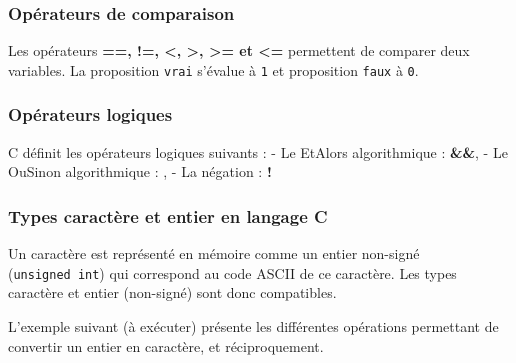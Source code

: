 \documentclass[11pt]{article}
\begin{document}
    \hypertarget{opuxe9rateurs-de-comparaison}{%
\subsubsection{Opérateurs de
comparaison}\label{opuxe9rateurs-de-comparaison}}

Les opérateurs \textbf{==, !=, \textless, \textgreater, \textgreater= et
\textless=} permettent de comparer deux variables. La proposition
\texttt{vrai} s'évalue à \texttt{1} et proposition \texttt{faux} à
\texttt{0}.

\hypertarget{opuxe9rateurs-logiques}{%
\subsubsection{Opérateurs logiques}\label{opuxe9rateurs-logiques}}

C définit les opérateurs logiques suivants : - Le EtAlors algorithmique
: \textbf{\&\&}, - Le OuSinon algorithmique :
\textbf{\textbar\textbar{}}, - La négation : \textbf{!}

    \hypertarget{types-caractuxe8re-et-entier-en-langage-c}{%
\subsubsection{Types caractère et entier en langage
C}\label{types-caractuxe8re-et-entier-en-langage-c}}

Un caractère est représenté en mémoire comme un entier non-signé
(\texttt{unsigned\ int}) qui correspond au code ASCII de ce caractère.
Les types caractère et entier (non-signé) sont donc compatibles.

L'exemple suivant (à exécuter) présente les différentes opérations
permettant de convertir un entier en caractère, et réciproquement.
\end{document}
